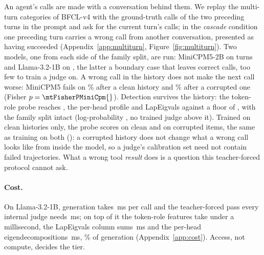 An agent's calls are made with a conversation behind them. We replay the multi-turn categories of BFCL-v4 with
the ground-truth calls of the two preceding turns in the prompt and ask for the current turn's calls; in the
\emph{cascade} condition one preceding turn carries a wrong call from another conversation, presented as
having succeeded (Appendix~\ref{app:multiturn}, Figure~\ref{fig:multiturn}). Two models, one from each side of
the family split, are run: MiniCPM5-2B on \mtNMiniCpm{} turns and Llama-3.2-1B on \mtNLlamaOneB{}, the latter a
boundary case that leaves \mtNegLlamaOneB{} correct calls, too few to train a judge on. A wrong call in the
history does not make
the next call worse: MiniCPM5 fails on \mtFailCleanMiniCpm{}\% after a clean history and
\mtFailCorruptMiniCpm{}\% after a corrupted one (Fisher $p=\mtFisherPMiniCpm{}$). Detection survives the
history: the token-role probe reaches \mtAucHiddenMiniCpm{}, the per-head profile \mtAucPerHeadMiniCpm{} and
LapEigvals \mtAucLapEigMiniCpm{} against a floor of \mtAucSurfaceMiniCpm{}, with the family split intact
(log-probability \mtAucLogprobMiniCpm{}, no trained judge above it). Trained on clean histories only, the probe
scores \mtAucHiddenCleanOnCleanMiniCpm{} on clean and \mtAucHiddenCorruptOnCleanMiniCpm{} on corrupted items,
the same as training on both (\mtAucHiddenCorruptOnAllMiniCpm{}): a corrupted history does not change what a
wrong call looks like from inside the model, so a judge's calibration set need not contain failed
trajectories. What a wrong tool \emph{result} does is a question this teacher-forced protocol cannot ask.

\paragraph{Cost.}
On Llama-3.2-1B, generation takes \latGen{}\,ms per call and the teacher-forced pass every internal judge
needs \latPass{}\,ms; on top of it the token-role features take under a millisecond, the LapEigvals column
sums \latLapEig{}\,ms and the per-head eigendecompositions \latPerHead{}\,ms, \latPerHeadPct{}\% of generation
(Appendix~\ref{app:cost}). Access, not compute, decides the tier.
